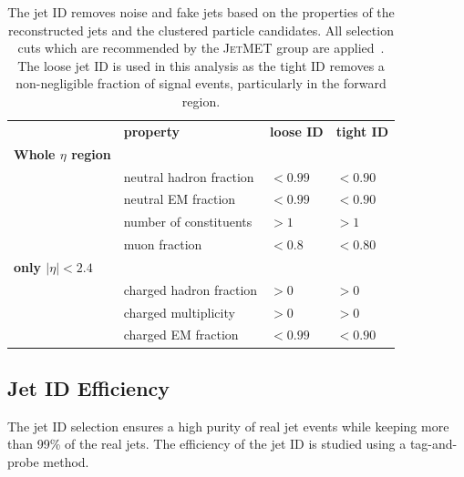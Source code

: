 \begin{table}[htbp]
    \centering
    \caption[Jet ID criteria]{The jet ID removes noise and fake jets based on
        the properties of the reconstructed jets and the clustered particle
        candidates. All selection cuts which are recommended by the
        \textsc{JetMET} group are applied~\cite{jetmet:jetid_twiki}. The loose jet ID is
        used in this analysis as the tight ID removes a non-negligible fraction
        of signal events, particularly in the forward region.}
    \label{tab:jetid}
    \begin{tabular}{llll}
    \toprule
                                 & \textbf{property}       & \textbf{loose ID} & \textbf{tight ID}\\\cmidrule(lr){2-4}
    \textbf{Whole $\eta$ region} &                         &                   & \\\cmidrule(lr){1-1}
                                 & neutral hadron fraction & $< 0.99$          & $< 0.90$\\
                                 & neutral EM fraction     & $< 0.99$          & $< 0.90$\\
                                 & number of constituents  & $> 1$             & $> 1$\\
                                 & muon fraction           & $< 0.8$           & $< 0.80$\\
    \textbf{only $|\eta| < 2.4$} &                         &                   & \\\cmidrule(lr){1-1}
                                 & charged hadron fraction & $> 0$             & $> 0$\\
                                 & charged multiplicity    & $> 0$             & $> 0$\\
                                 & charged EM fraction     & $< 0.99$          & $< 0.90$\\
    \bottomrule
    \end{tabular}
\end{table}


\subsection{Jet ID Efficiency}

The jet ID selection ensures a high purity of real jet events while keeping more
than 99\% of the real jets. The efficiency of the jet ID is studied using a
tag-and-probe method. 

